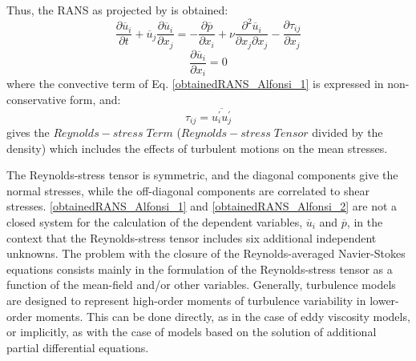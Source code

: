Thus, the RANS as projected by \cite{Hinze1975} is obtained:
\begin{equation} \label{obtainedRANS_Alfonsi_1}
	\frac{\partial\overline{u}_i}{\partial t} + \overline{u}_j \frac{\partial\overline{u}_i}{\partial x_j} = - \frac{\partial\overline{p}}{\partial x_i} + \nu\frac{\partial^2\overline{u}_i}{\partial x_j \partial x_j} - \frac{\partial\tau_{ij}}{\partial x_j}
\end{equation}
\begin{equation} \label{obtainedRANS_Alfonsi_2}
	\frac{\partial\overline{u}_i}{\partial x_i} = 0
\end{equation}
where the convective term of Eq. \ref{obtainedRANS_Alfonsi_1} is expressed in non-conservative form, and:
\begin{equation}
	\tau_{ij} = \overline{u_i^\prime u_j^\prime}
\end{equation}
gives the $Reynolds-stress\;Term$ ($Reynolds-stress\;Tensor$ divided by the density) which includes the effects of turbulent motions on the mean stresses.

The Reynolds-stress tensor is symmetric, and the diagonal components give the normal stresses, while the off-diagonal components are correlated to shear stresses. \ref{obtainedRANS_Alfonsi_1} and \ref{obtainedRANS_Alfonsi_2} are not a closed system for the calculation of the dependent variables, $\overline{u}_i$ and $\overline{p}$, in the context that the Reynolds-stress tensor includes six additional independent unknowns. The problem with the closure of the Reynolds-averaged Navier-Stokes equations consists mainly in the formulation of the Reynolds-stress tensor as a function of the mean-field and/or other variables.
Generally, turbulence models are designed to represent high-order moments of turbulence variability in lower-order moments. This can be done directly, as in the case of eddy viscosity models, or implicitly, as with the case of models based on the solution of additional partial differential equations.

